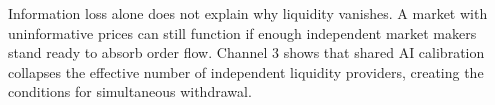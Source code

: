 Information loss alone does not explain why liquidity vanishes. A market with uninformative prices can still function if enough independent market makers stand ready to absorb order flow. Channel 3 shows that shared AI calibration collapses the effective number of independent liquidity providers, creating the conditions for simultaneous withdrawal.
